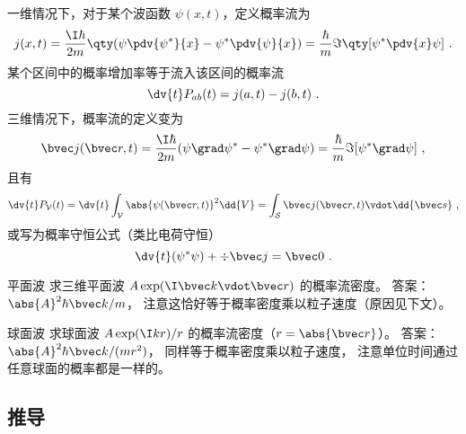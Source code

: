 

一维情况下，对于某个波函数 $\psi(x,t)$，定义概率流为
\begin{equation}
j(x,t) = \frac{\I\hbar}{2m} \qty(\psi \pdv{\psi^*}{x} - \psi^* \pdv{\psi}{x})
= \frac{\hbar}{m} \Im\qty[\psi^* \pdv{x} \psi]~.
\end{equation}
某个区间中的概率增加率等于流入该区间的概率流
\begin{equation}
\dv{t} P_{ab}(t) = j(a,t) - j(b,t)~.
\end{equation}
三维情况下，概率流的定义变为
\begin{equation}
\bvec j(\bvec r,t) = \frac{\I\hbar }{2m} (\psi \grad \psi^* - \psi ^* \grad \psi)
= \frac{\hbar}{m} \Im[\psi^* \grad\psi]~,
\end{equation}
且有
\begin{equation}
\dv{t} P_\mathcal{V}(t) = \dv{t} \int_\mathcal{V} \abs{\psi (\bvec r,t)}^2 \dd{V}
= \int_\mathcal{S} \bvec j(\bvec r,t) \vdot \dd{\bvec s}~,
\end{equation}
或写为概率守恒公式（类比电荷守恒）
\begin{equation}
\dv{t} (\psi^* \psi) + \div\bvec j = \bvec 0~.
\end{equation}

\begin{exercise}{平面波}
求三维平面波 $A \exp(\I \bvec k \vdot \bvec r)$ 的概率流密度。 答案： $\abs{A}^2 \hbar\bvec k/m$， 注意这恰好等于概率密度乘以粒子速度（原因见下文）。
\end{exercise}

\begin{exercise}{球面波}
求球面波 $A \exp(\I k r)/r$ 的概率流密度（$r = \abs{\bvec r}$）。 答案： $\abs{A}^2 \hbar\bvec k/(mr^2)$， 同样等于概率密度乘以粒子速度， 注意单位时间通过任意球面的概率都是一样的。
\end{exercise}

\subsection{推导}

